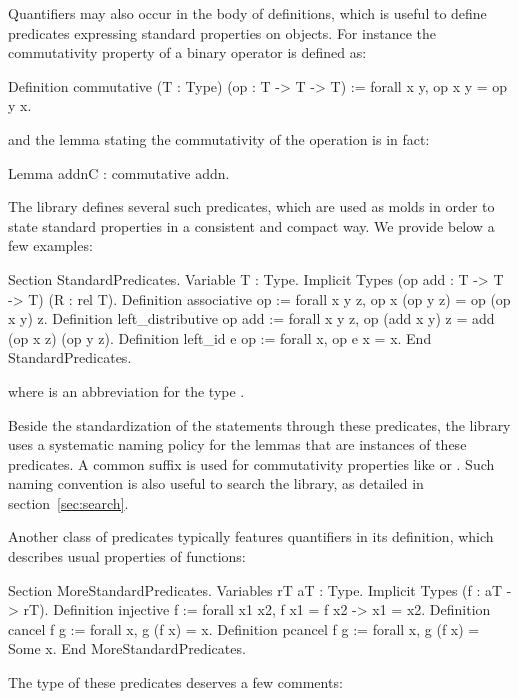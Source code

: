 Quantifiers may also occur in the body of definitions, which is
useful to define predicates expressing standard properties on
objects. For instance the commutativity property of a binary operator
is defined as:

\begin{coq}{}{}
Definition commutative (T : Type) (op : T -> T -> T) :=
  forall x y, op x y = op y x.
\end{coq}
and the lemma stating the commutativity of the  operation is
in fact:

\begin{coq}{}{}
Lemma addnC : commutative addn.
\end{coq}
The \mcbMC{} library defines several such predicates, which are used
as molds in order to state standard properties in a consistent and
compact way. We provide below a few examples:

\begin{coq}{}{}
Section StandardPredicates.
Variable T : Type.
Implicit Types (op add : T -> T -> T) (R : rel T).
Definition associative op := forall x y z, op x (op y z) = op (op x y) z.
Definition left_distributive op add :=
  forall x y z, op (add x y) z = add (op x z) (op y z).
Definition left_id e op := forall x, op e x = x.
End StandardPredicates.
\end{coq}
where  is an abbreviation for the type .

Beside the standardization of the statements through these
predicates, the \mcbMC{} library uses a systematic naming policy for the lemmas
that are instances of these predicates. A common suffix  is
used for commutativity properties like  or .
Such naming convention is also useful to search the library, as detailed
in section~\ref{sec:search}.

Another class of predicates typically features quantifiers in its
definition, which describes usual properties of functions:

\begin{coq}{}{}
Section MoreStandardPredicates.
Variables rT aT : Type.
Implicit Types (f : aT -> rT).
Definition injective f := forall x1 x2, f x1 = f x2 -> x1 = x2.
Definition cancel f g := forall x, g (f x) = x.
Definition pcancel f g := forall x, g (f x) = Some x.
End MoreStandardPredicates.
\end{coq}
The type of these predicates deserves a few comments:

